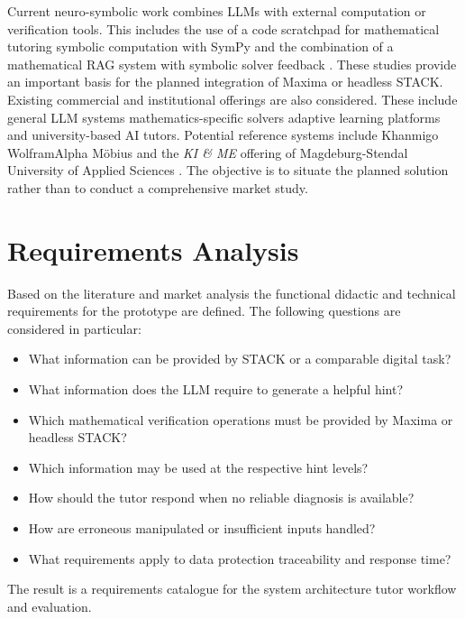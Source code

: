 \documentclass[11pt,a4paper,oneside,ngerman]{memoir}
\begin{document}
Current neuro-symbolic work combines LLMs with external computation or verification tools. This includes the use of a code scratchpad for mathematical tutoring \autocite{upadhyay2023scratchpad} symbolic computation with SymPy \autocite{meurer2017sympy} and the combination of a mathematical RAG system with symbolic solver feedback \autocite{wang2026lowhallucination}. These studies provide an important basis for the planned integration of Maxima or headless STACK.
Existing commercial and institutional offerings are also considered. These include general LLM systems mathematics-specific solvers adaptive learning platforms and university-based AI tutors. Potential reference systems include Khanmigo \autocite{khanmigo} WolframAlpha \autocite{wolframalpha} Möbius \autocite{maplesoftmobius} and the \textit{KI \& ME} offering of Magdeburg-Stendal University of Applied Sciences \autocite{kiandme}. The objective is to situate the planned solution rather than to conduct a comprehensive market study.
\section{Requirements Analysis}
Based on the literature and market analysis the functional didactic and technical requirements for the prototype are defined. The following questions are considered in particular:
\begin{itemize}
    \item What information can be provided by STACK or a comparable digital task?
    \item What information does the LLM require to generate a helpful hint?
    \item Which mathematical verification operations must be provided by Maxima or headless STACK?
    \item Which information may be used at the respective hint levels?
    \item How should the tutor respond when no reliable diagnosis is available?
    \item How are erroneous manipulated or insufficient inputs handled?
    \item What requirements apply to data protection traceability and response time?
\end{itemize}
The result is a requirements catalogue for the system architecture tutor workflow and evaluation.
\end{document}
